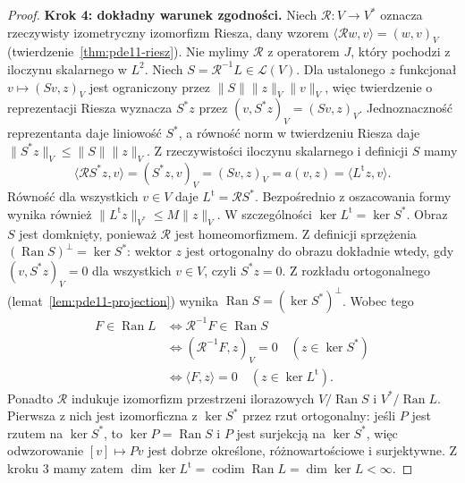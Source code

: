 \begin{proof}
\textbf{Krok 4: dokładny warunek zgodności.}
Niech $\mathcal R:V\to V^*$ oznacza rzeczywisty izometryczny
izomorfizm Riesza, dany wzorem
$\langle\mathcal Rw,v\rangle=(w,v)_V$
(twierdzenie~\ref{thm:pde11-riesz}).
Nie mylimy $\mathcal R$ z operatorem $J$, który pochodzi
z iloczynu skalarnego w $L^2$.
Niech $S=\mathcal R^{-1}L\in\mathcal L(V)$.
Dla ustalonego $z$ funkcjonał $v\mapsto(Sv,z)_V$
jest ograniczony przez $\|S\|\|z\|_V\|v\|_V$, więc twierdzenie
o reprezentacji Riesza wyznacza $S^*z$ przez
$(v,S^*z)_V=(Sv,z)_V$. Jednoznaczność reprezentanta
daje liniowość $S^*$, a równość norm w twierdzeniu Riesza
daje $\|S^*z\|_V\le\|S\|\|z\|_V$.
Z rzeczywistości iloczynu skalarnego i definicji $S$ mamy
\[
 \langle\mathcal R S^*z,v\rangle
 =(S^*z,v)_V=(Sv,z)_V=a(v,z)
 =\langle L^{\mathrm t}z,v\rangle.
\]
Równość dla wszystkich $v\in V$ daje
$L^{\mathrm t}=\mathcal R S^*$.
Bezpośrednio z oszacowania formy wynika również
$\|L^{\mathrm t}z\|_{V^*}\le M\|z\|_V$. W szczególności
$\ker L^{\mathrm t}=\ker S^*$.
Obraz $S$ jest domknięty, ponieważ $\mathcal R$ jest
homeomorfizmem. Z definicji sprzężenia
$(\operatorname{Ran}S)^\perp=\ker S^*$: wektor $z$ jest
ortogonalny do obrazu dokładnie wtedy, gdy
$(v,S^*z)_V=0$ dla wszystkich $v\in V$, czyli $S^*z=0$.
Z rozkładu ortogonalnego (lemat~\ref{lem:pde11-projection})
wynika
$\operatorname{Ran}S=(\ker S^*)^\perp$.
Wobec tego
\[
 \begin{aligned}
 F\in\operatorname{Ran}L
 &\Longleftrightarrow \mathcal R^{-1}F\in\operatorname{Ran}S\\
 &\Longleftrightarrow
 (\mathcal R^{-1}F,z)_V=0\quad(z\in\ker S^*)\\
 &\Longleftrightarrow
 \langle F,z\rangle=0\quad(z\in\ker L^{\mathrm t}).
 \end{aligned}
\]
Ponadto $\mathcal R$ indukuje izomorfizm przestrzeni
ilorazowych $V/\operatorname{Ran}S$ i $V^*/\operatorname{Ran}L$.
Pierwsza z nich jest izomorficzna z $\ker S^*$ przez rzut
ortogonalny: jeśli $P$ jest rzutem na $\ker S^*$, to
$\ker P=\operatorname{Ran}S$ i $P$ jest surjekcją na
$\ker S^*$, więc odwzorowanie $[v]\mapsto Pv$
jest dobrze określone, różnowartościowe i surjektywne. Z kroku 3 mamy zatem
$\dim\ker L^{\mathrm t}=\operatorname{codim}\operatorname{Ran}L
=\dim\ker L<\infty$.


\end{proof}
